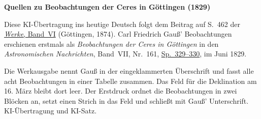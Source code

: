 \clearpage\thispagestyle{empty}
\begin{center}\textbf{Quellen zu Beobachtungen der Ceres in Göttingen (1829)}\end{center}
\noindent Diese KI-Übertragung ins heutige Deutsch folgt dem Beitrag auf S.~462 der \href{https://gdz.sub.uni-goettingen.de/id/PPN236007467}{\textit{Werke}, Band~VI} (Göttingen, 1874). Carl Friedrich Gauß’ Beobachtungen erschienen erstmals als \textit{Beobachtungen der Ceres in Göttingen} in den \textit{Astronomischen Nachrichten}, Band~VII, Nr.~161, \href{https://api.digitale-sammlungen.de/iiif/image/v2/bsb10049432_00211/full/1800,/0/default.jpg}{Sp.~329--330}, im Juni 1829.
\par\smallskip\noindent Die Werkausgabe nennt Gauß in der eingeklammerten Überschrift und fasst alle acht Beobachtungen in einer Tabelle zusammen. Das Feld für die Deklination am 16. März bleibt dort leer. Der Erstdruck ordnet die Beobachtungen in zwei Blöcken an, setzt einen Strich in das Feld und schließt mit Gauß’ Unterschrift. KI-Übertragung und KI-Satz.
\clearpage
